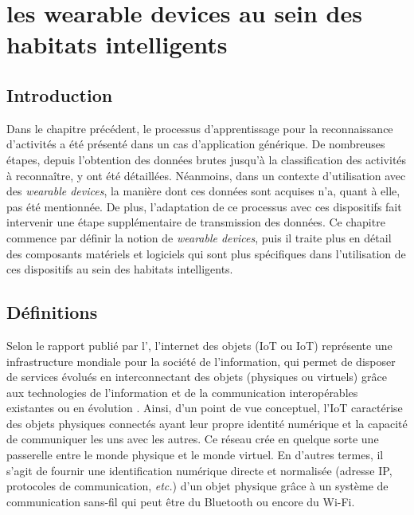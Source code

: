 \chapter{les wearable devices au sein des habitats intelligents}
\label{chap:3}

\section{Introduction}

Dans le chapitre précédent, le processus d'apprentissage pour la reconnaissance d'activités a été présenté dans un cas d'application générique. De nombreuses étapes, depuis l'obtention des données brutes jusqu'à la classification des activités à reconnaître, y ont été détaillées. Néanmoins, dans un contexte d'utilisation avec des \textit{wearable devices}, la manière dont ces données sont acquises n'a, quant à elle, pas été mentionnée. De plus, l'adaptation de ce processus avec ces dispositifs fait intervenir une étape supplémentaire de transmission des données. Ce chapitre commence par définir la notion de \textit{wearable devices}, puis il traite plus en détail des composants matériels et logiciels qui sont plus spécifiques dans l'utilisation de ces dispositifs au sein des habitats intelligents.

\section{Définitions}

Selon le rapport publié par l'\cite{InternationalTelecommunicationUnion2012}, l'internet des objets (\acl{IoT} ou \acs{IoT}) représente une \og infrastructure mondiale pour la société de l'information, qui permet de disposer de services évolués en interconnectant des objets (physiques ou virtuels) grâce aux technologies de l'information et de la communication interopérables existantes ou en évolution \fg. Ainsi, d'un point de vue conceptuel, l'\acs{IoT} caractérise des objets physiques connectés ayant leur propre identité numérique et la capacité de communiquer les uns avec les autres. Ce réseau crée en quelque sorte une passerelle entre le monde physique et le monde virtuel. En d'autres termes, il s'agit de fournir une identification numérique directe et normalisée (adresse IP, protocoles de communication, \textit{etc.}) d'un objet physique grâce à un système de communication sans-fil qui peut être du Bluetooth ou encore du Wi-Fi.

